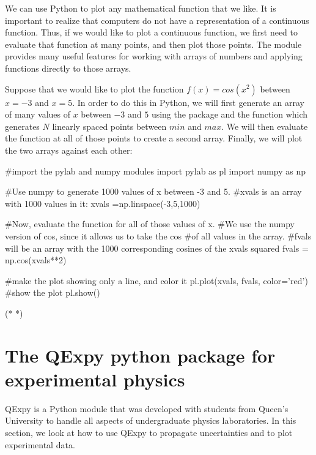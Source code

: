 We can use Python to plot any mathematical function that we like. It is important to realize that computers do not have a representation of a continuous function. Thus, if we would like to plot a continuous function, we first need to evaluate that function at many points, and then plot those points. The  module provides many useful features for working with arrays of numbers and applying functions directly to those arrays. 

Suppose that we would like to plot the function $f(x) = cos(x^2)$ between $x=-3$ and $x=5$. In order to do this in Python, we will first generate an array of many values of $x$ between $-3$ and $5$ using the  package and the function  which generates $N$ linearly spaced points between $min$ and $max$. We will then evaluate the function at all of those points to create a second array. Finally, we will plot the two arrays against each other:
\begin{python}[caption=Plotting a function of 1 variable]
#import the pylab and numpy modules
import pylab as pl
import numpy as np

#Use numpy to generate 1000 values of x between -3 and 5.
#xvals is an array with 1000 values in it:
xvals =np.linspace(-3,5,1000) 

#Now, evaluate the function for all of those values of x.
#We use the numpy version of cos, since it allows us to take the cos 
#of all values in the array.
#fvals will be an array with the 1000 corresponding cosines of the xvals squared
fvals = np.cos(xvals**2)

#make the plot showing only a line, and color it
pl.plot(xvals, fvals, color='red')
#show the plot
pl.show()

\end{python}
\begin{poutput}
(*   *)
\end{poutput}

\section{The QExpy python package for experimental physics}
QExpy is a Python module that was developed with students from Queen's University to handle all aspects of undergraduate physics laboratories. In this section, we look at how to use QExpy to propagate uncertainties and to plot experimental data.


